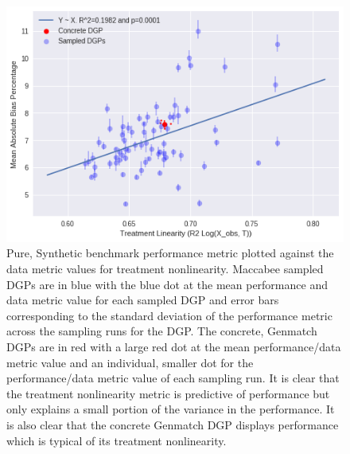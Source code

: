 \documentclass[../main.tex]{subfiles}
\begin{document}
\begin{figure}[ht!]
    \centering
    \includegraphics[width=0.9\linewidth]{figures/ch7-benchmark-pure-synth-2.png}
    \caption{Pure, Synthetic benchmark performance metric plotted against the data metric values for treatment nonlinearity. Maccabee sampled DGPs are in blue with the blue dot at the mean performance and data metric value for each sampled DGP and error bars corresponding to the standard deviation of the performance metric across the sampling runs for the DGP. The concrete, Genmatch DGPs are in red with a large red dot at the mean performance/data metric value and an individual, smaller dot for the performance/data metric value of each sampling run. It is clear that the treatment nonlinearity metric is predictive of performance but only explains a small portion of the variance in the performance. It is also clear that the concrete Genmatch DGP displays performance which is typical of its treatment nonlinearity.}
    \label{fig:benchmark-validation-pure-synth-2}
\end{figure}
\FloatBarrier
\end{document}
